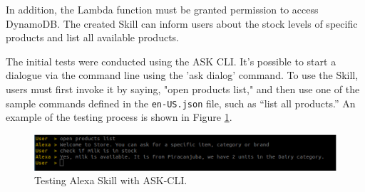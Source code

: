 In addition, the Lambda function must be granted permission to access DynamoDB. The created Skill can inform users about the stock levels of specific products and list all available products.

The initial tests were conducted using the ASK CLI. It’s possible to start a dialogue via the command line using the 'ask dialog' command. To use the Skill, users must first invoke it by saying, "open products list," and then use one of the sample commands defined in the \texttt{en-US.json} file, such as “list all products.” An example of the testing process is shown in Figure \ref{ask-cli}.

\begin{figure}[h] 
	\centering \includegraphics[width=\textwidth]{images/ask-cli} 					\caption{Testing Alexa Skill with ASK-CLI.} 
	\label{ask-cli} 
\end{figure}

